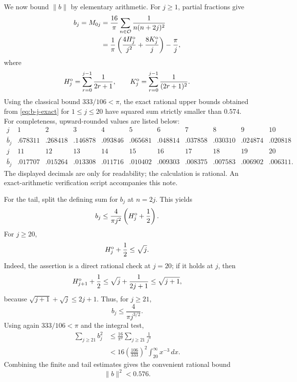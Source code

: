 \documentclass[11pt]{article}
\begin{document}
We now bound $\|b\|$ by elementary arithmetic.  For $j\ge1$, partial
fractions give
\begin{equation}\label{eq:b-j-exact}
\begin{aligned}
 b_j=M_{0j}
 &=\frac{16}{\pi}
 \sum_{n\in\mathcal O}\frac1{n(n+2j)^2}\\
 &=\frac1\pi\left(
 \frac{4H_j^{\rm o}}{j^2}
 +\frac{8K_j^{\rm o}}j
 \right)-\frac\pi j,
\end{aligned}
\end{equation}
where
\[
 H_j^{\rm o}=\sum_{r=0}^{j-1}\frac1{2r+1},
 \qquad
 K_j^{\rm o}=\sum_{r=0}^{j-1}\frac1{(2r+1)^2}.
\]
Using the classical bound $333/106<\pi$, the exact rational upper bounds
obtained from \eqref{eq:b-j-exact} for $1\le j\le20$ have squared sum
strictly smaller than $0.574$.  For completeness, upward-rounded values are
listed below:
\[
\begin{array}{c|rrrrrrrrrr}
 j&1&2&3&4&5&6&7&8&9&10\\ \hline
 \overline b_j
 &.678311&.268418&.146878&.093846&.065681
 &.048814&.037858&.030310&.024874&.020818
\end{array}
\]
\[
\begin{array}{c|rrrrrrrrrr}
 j&11&12&13&14&15&16&17&18&19&20\\ \hline
 \overline b_j
 &.017707&.015264&.013308&.011716&.010402
 &.009303&.008375&.007583&.006902&.006311.
\end{array}
\]
The displayed decimals are only for readability; the calculation is rational.
An exact-arithmetic verification script accompanies this note.

For the tail, split the defining sum for $b_j$ at $n=2j$.  This yields
\begin{equation}\label{eq:b-tail-pre}
 b_j
 \le
 \frac4{\pi j^2}\left(H_j^{\rm o}+\frac12\right).
\end{equation}
For $j\ge20$,
\[
        H_j^{\rm o}+\frac12\le\sqrt j.
\]
Indeed, the assertion is a direct rational check at $j=20$; if it holds at
$j$, then
\[
 H_{j+1}^{\rm o}+\frac12
 \le\sqrt j+\frac1{2j+1}
 \le\sqrt{j+1},
\]
because
$\sqrt{j+1}+\sqrt j\le2j+1$.
Thus, for $j\ge21$,
\[
        b_j\le\frac4{\pi j^{3/2}}.
\]
Using again $333/106<\pi$ and the integral test,
\[
\begin{aligned}
 \sum_{j\ge21}b_j^2
 &\le\frac{16}{\pi^2}\sum_{j\ge21}\frac1{j^3}\\
 &<16\left(\frac{106}{333}\right)^2
 \int_{20}^{\infty}x^{-3}\,dx.
\end{aligned}
\]
Combining the finite and tail estimates gives the convenient rational bound
\begin{equation}\label{eq:b-norm-0576}
        \boxed{\|b\|^2<0.576.}
\end{equation}
\end{document}
